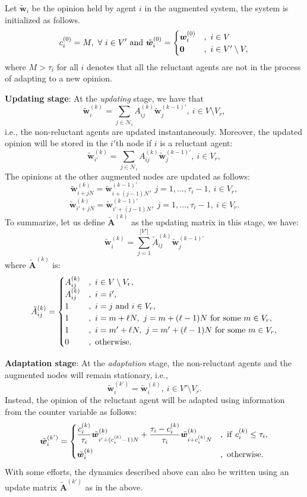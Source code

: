 \documentclass[letter]{article}
\theoremstyle{remark}
\begin{document}
Let $\tilde{ \bm w}_i$ be the opinion held by agent $i$ in the augmented system, the system is initialized as follows.
\[
c_i^{(0)} = M,~\forall~ i \in V'~{\rm and}~\tilde{ \bm w}_i^{(0)} = \begin{cases} { \bm w}_i^{(0)} &,~i \in V \\
 {\bf 0} &,~i \in V' \setminus V, \end{cases}
\]
where $M > \tau_i$ for all $i$ denotes that all the reluctant agents are not in the process of adapting to a new opinion. 

\textbf{Updating stage}: At the \emph{updating} stage, we have that 
\[
\tilde{\bm w}_i^{(k)} = \sum_{j \in \mathcal{N}_i} A_{ij}^{(k)} \tilde{\bm w}_j^{(k-1)'},~i \in V \setminus V_r,
\]
i.e., the non-reluctant agents are updated instantaneously. Moreover, the updated opinion will be stored in the $i'$th node if $i$ is a reluctant agent:
\[
\tilde{\bm w}_{i'}^{(k)} = \sum_{j \in \mathcal{N}_i} A_{ij}^{(k)} \tilde{\bm w}_j^{(k-1)'},~i \in  V_r,
\]
The opinions at the other augmented nodes are updated as follows:
\[
\tilde{\bm w}_{i+j N}^{(k)} = \tilde{\bm w}_{i + (j-1)N}^{(k-1)'},~j=1,...,\tau_i - 1,~i \in V_r,
\]
\[
\tilde{\bm w}_{i' +j N}^{(k)} = \tilde{\bm w}_{i' + (j-1)N}^{(k-1)'},~j=1,...,\tau_i - 1,~i \in V_r.
\]
To summarize, let us define $\tilde{\bm A}^{(k)}$ as the updating matrix in this stage, we have:
\[
\tilde{\bm w}_i^{(k)} = \sum_{j=1}^{|V'|} \tilde{A}_{ij}^{(k)} \tilde{\bm w}_j^{(k-1)'}
\]
where $\tilde{\bm A}^{(k)}$ is:
\begin{equation} \label{eq:a_update}
\tilde{A}_{ij}^{(k)} = \begin{cases}
A_{ij}^{(k)} &,~i \in V \setminus V_r, \\
A_{ij}^{(k)} &,~i = i', \\
1 &,~i = j~{\rm and}~i \in V_r,\\
1 &,~i = m + \ell N,~j=m + (\ell-1) N~{\rm for~some}~m \in V_r, \\
1 &,~i = m' + \ell N,~j=m' + (\ell-1) N~{\rm for~some}~m \in V_r, \\
0 &,~{\rm otherwise}.
\end{cases}
\end{equation}

\textbf{Adaptation stage}: At the \emph{adaptation} stage, the non-reluctant agents and the augmented nodes will remain stationary, i.e.,
\[
\tilde{\bm w}_i^{(k')} = \tilde{\bm w}_i^{(k)},~i \in V' \setminus V_r.
\]
Instead, the opinion of the reluctant agent will be adapted using information from the counter variable as follows:
\[
\tilde{\bm w}_i^{(k')} = \begin{cases}
\displaystyle \frac{c_i^{(k)}}{\tau_i} \tilde{\bm w}_{i' + (c_i^{(k)}-1)N}^{(k)} + \frac{\tau_i - c_i^{(k)}}{\tau_i} \tilde{\bm w}_{i + c_i^{(k)}N}^{(k)} &,~{\rm if}~c_i^{(k)} \leq \tau_i, \vspace{.2cm} \\
\tilde{\bm w}_i^{(k)} &,~{\rm otherwise}.
\end{cases}
\]
With some efforts, the dynamics described above can also be written using an update matrix $\tilde{\bm A}^{(k')}$ as in the above. 
\end{document}
